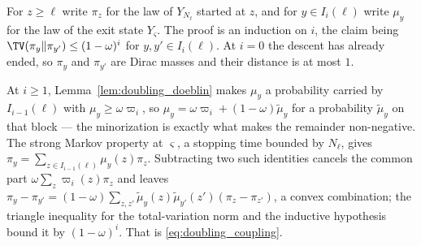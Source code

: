 For $z\geq\ell$ write $\pi_z$ for the law of $Y_{N_\ell}$ started at $z$, and for
$y\in I_i(\ell)$ write $\mu_y$ for the law of the exit state $Y_\varsigma$. The proof is an
induction on $i$, the claim being $\TV(\pi_y\|\pi_{y'})\leq(1-\omega)^{i}$ for
$y,y'\in I_i(\ell)$. At $i=0$ the descent has already ended, so $\pi_y$ and $\pi_{y'}$ are
Dirac masses and their distance is at most $1$.

At $i\geq1$, Lemma~\ref{lem:doubling_doeblin} makes $\mu_y$ a probability carried by
$I_{i-1}(\ell)$ with $\mu_y\geq\omega\varpi_i$, so
$\mu_y=\omega\varpi_i+(1-\omega)\widetilde\mu_y$ for a probability $\widetilde\mu_y$ on that
block --- the minorization is exactly what makes the remainder non-negative. The strong Markov
property at $\varsigma$, a stopping time bounded by $N_\ell$, gives
$\pi_y=\sum_{z\in I_{i-1}(\ell)}\mu_y(z)\pi_z$. Subtracting two such identities cancels the
common part $\omega\sum_z\varpi_i(z)\pi_z$ and leaves
$\pi_y-\pi_{y'}=(1-\omega)\sum_{z,z'}\widetilde\mu_y(z)\widetilde\mu_{y'}(z')(\pi_z-\pi_{z'})$,
a convex combination; the triangle inequality for the total-variation norm and the inductive
hypothesis bound it by $(1-\omega)^{i}$. That is \eqref{eq:doubling_coupling}.

